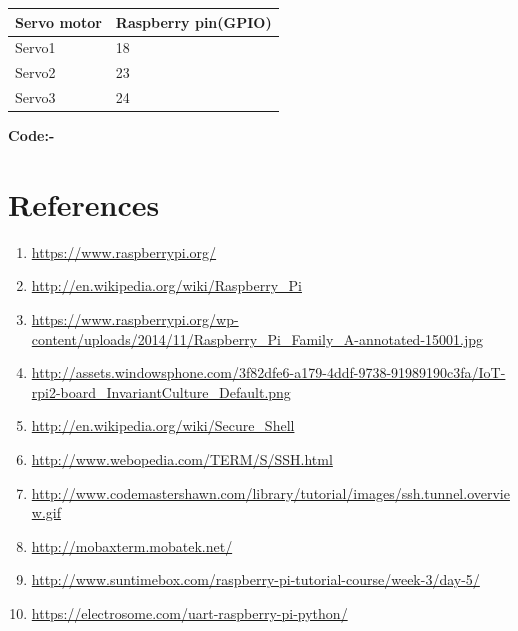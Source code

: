 \documentclass[11pt,a4paper]{report}
\begin{document}
\begin{flushleft}
\begin{tabular}{ |p{3cm}|p{3cm}| }
 \hline
 Servo motor& Raspberry pin(GPIO)\\
 \hline
 Servo1&18\\
 \hline
 Servo2&23\\
 \hline
 Servo3&24\\
 \hline
 \end{tabular}
 \vspace{0.2cm} 
	    \flushleft
	\textbf{Code:-}
	



	
		\newpage
	\chapter{References}
		\begin{enumerate}
		\item \url{https://www.raspberrypi.org/}
		\item \url{http://en.wikipedia.org/wiki/Raspberry_Pi}	
		\item \url{https://www.raspberrypi.org/wp-content/uploads/2014/11/Raspberry_Pi_Family_A-annotated-15001.jpg}
		\item \url{http://assets.windowsphone.com/3f82dfe6-a179-4ddf-9738-91989190c3fa/IoT-rpi2-board_InvariantCulture_Default.png}	
		\item \url{http://en.wikipedia.org/wiki/Secure_Shell}
		\item \url{http://www.webopedia.com/TERM/S/SSH.html}
		\item \url{http://www.codemastershawn.com/library/tutorial/images/ssh.tunnel.overview.gif}
		\item \url{http://mobaxterm.mobatek.net/}
		\item \url{http://www.suntimebox.com/raspberry-pi-tutorial-course/week-3/day-5/}
		\item \url{https://electrosome.com/uart-raspberry-pi-python/}
	\end{enumerate}
	
	
\end{flushleft}
\end{document}
